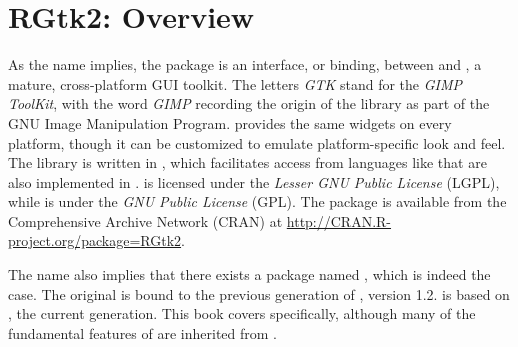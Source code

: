




\chapter{RGtk2: Overview}
\label{sec:RGtk2-Introduction}


As the name implies, the  package is an interface, or
binding, between \R\/ and \GTK, a mature, cross-platform GUI
toolkit. The letters \emph{GTK} stand for the \emph{GIMP ToolKit},
with the word \emph{GIMP} recording the origin of the library as part
of the GNU Image Manipulation Program. \GTK\/ provides the same
widgets on every platform, though it can be customized to emulate
platform-specific look and feel. The library is written in
, which facilitates access from languages like
 that are also implemented in . \GTK\/ is
licensed under the \textit{Lesser GNU Public License} (LGPL), while
 is under the \textit{GNU Public License} (GPL).
The package is available from the Comprehensive  Archive
Network (CRAN) at \url{http://CRAN.R-project.org/package=RGtk2}.

The name  also implies that there exists a package named
, which is indeed the case. The original  is bound
to the previous generation of \GTK\/, version 1.2.  is
based on , the current generation. This book covers
 specifically, although many of the fundamental features of
 are inherited from . 

